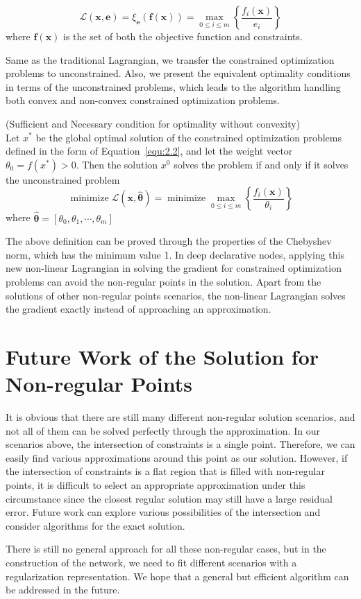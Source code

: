 \begin{equation}
    \label{equ:non-linear-lag}
    \mathcal{L}(\mathbf{x}, \mathbf{e})=\xi_{\mathbf{e}}(\mathbf{f}(\mathbf{x}))=\max _{0 \leq i \leq m}\left\{\frac{f_{i}(\mathbf{x})}{e_{i}}\right\}
\end{equation}
where $\mathbf{f}(\mathbf{x})$ is the set of both the objective function and constraints. 
\par Same as the traditional Lagrangian, we transfer the constrained optimization problems to unconstrained. Also, we present the equivalent optimality conditions in terms of the unconstrained problems, which leads to the algorithm handling both convex and non-convex constrained optimization problems. 
\begin{defn}{(Sufficient and Necessary condition for optimality without convexity)\cite{GC:97}}
    \\
    Let $x^*$ be the global optimal solution of the constrained optimization problems defined in the form of Equation~\ref{equ:2.2}, and let the weight vector $\theta_0 = f(x^*) > 0$. Then the solution $x^0$ solves the problem if and only if it solves the unconstrained problem
    $$
        \operatorname{minimize} \mathcal{L}(\mathbf{x}, \hat{\boldsymbol{\theta}}) = \operatorname{minimize} \max _{0 \leq i \leq m}\left\{\frac{f_{i}(\mathbf{x})}{\theta_{i}}\right\}
    $$
    where $\hat{\boldsymbol{\theta}}=\left[\theta_{0}, \theta_{1}, \cdots, \theta_{m}\right]$
\end{defn}
\par The above definition can be proved through the properties of the Chebyshev norm, which has the minimum value 1. In deep declarative nodes, applying this new non-linear Lagrangian in solving the gradient for constrained optimization problems can avoid the non-regular points in the solution. Apart from the solutions of other non-regular points scenarios, the non-linear Lagrangian solves the gradient exactly instead of approaching an approximation. 

\section{Future Work of the Solution for Non-regular Points}
\label{sec:futurework-non}
It is obvious that there are still many different non-regular solution scenarios, and not all of them can be solved perfectly through the approximation. In our scenarios above, the intersection of constraints is a single point. Therefore, we can easily find various approximations around this point as our solution. However, if the intersection of constraints is a flat region that is filled with non-regular points, it is difficult to select an appropriate approximation under this circumstance since the closest regular solution may still have a large residual error. Future work can explore various possibilities of the intersection and consider algorithms for the exact solution.
\par There is still no general approach for all these non-regular cases, but in the construction of the network, we need to fit different scenarios with a regularization representation. We hope that a general but efficient algorithm can be addressed in the future. 
